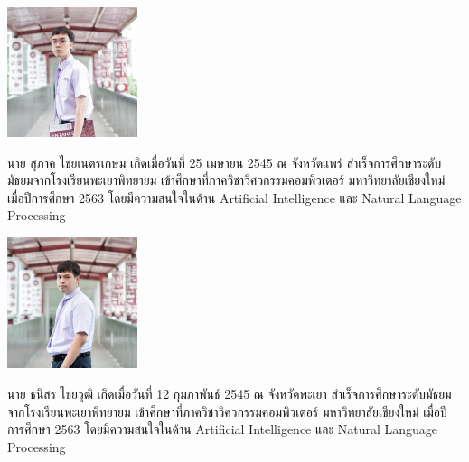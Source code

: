 \documentclass[semifinal]{cpecmu}
\author{นายสุภาค ไชยเนตรเกษม}{Supak Chainetkasem}{630610769}
\author{นายธนิสร ไชยวุฒิ}{Thanisorn Chaiwut}{630610738}
\begin{document}


\pagestyle{empty}\cleardoublepage
\normalspacing \setcounter{page}{1}  \pagestyle{cpecmu}





\ifproject

\fi



\ifproject
\normalspacing
\appendix


\ifglossary\glossarypage\fi

\ifindex\indexpage\fi

\begin{biosketch}
\begin{center}
  \includegraphics[width=1.5in]{supak.jpg}
\end{center}
นาย สุภาค ไชยเนตรเกษม เกิดเมื่อวันที่ 25 เมษายน 2545 ณ จังหวัดแพร่
สำเร็จการศึกษาระดับมัธยมจากโรงเรียนพะเยาพิทยายม เข้าศึกษาที่ภาควิชาวิศวกรรมคอมพิวเตอร์
มหาวิทยาลัยเชียงใหม่ เมื่อปีการศึกษา 2563 โดยมีความสนใจในด้าน Artificial Intelligence
และ Natural Language Processing

  \begin{center}
    \includegraphics[width=1.5in]{thanisorn.png}
  \end{center}
  นาย ธนิสร ไชยวุฒิ เกิดเมื่อวันที่ 12 กุมภาพันธ์ 2545 ณ จังหวัดพะเยา
  สำเร็จการศึกษาระดับมัธยมจากโรงเรียนพะเยาพิทยายม เข้าศึกษาที่ภาควิชาวิศวกรรมคอมพิวเตอร์
  มหาวิทยาลัยเชียงใหม่ เมื่อปีการศึกษา 2563 โดยมีความสนใจในด้าน Artificial Intelligence
  และ Natural Language Processing
  \end{biosketch}
\fi %
\end{document}
